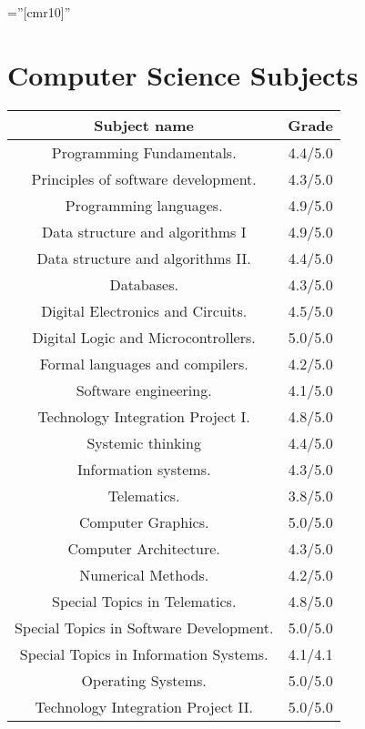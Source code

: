 \documentclass[a4paper,10pt]{article} %
\begin{document}
\pagestyle{empty} %

\font\fb=''[cmr10]'' %


\par{\bigskip\par} %

\section{Computer Science Subjects}
\begin {center}
\begin{tabular}{| c | c |}
 \hline
 \textbf{Subject name} & \textbf{Grade}\\ \hline
Programming Fundamentals. & 4.4/5.0\\
Principles of software development. & 4.3/5.0\\
Programming languages.  & 4.9/5.0\\
Data structure and algorithms I  & 4.9/5.0\\
Data structure and algorithms II. & 4.4/5.0\\
Databases.  & 4.3/5.0\\
Digital Electronics and Circuits.  & 4.5/5.0\\
Digital Logic and Microcontrollers.  & 5.0/5.0\\
Formal languages and compilers.  & 4.2/5.0\\
Software engineering.  & 4.1/5.0\\
Technology Integration Project I.  & 4.8/5.0\\
Systemic thinking  & 4.4/5.0\\
Information systems.  & 4.3/5.0\\
Telematics. & 3.8/5.0\\
Computer Graphics.  & 5.0/5.0\\
Computer Architecture. & 4.3/5.0\\
Numerical Methods. & 4.2/5.0\\
Special Topics in Telematics. & 4.8/5.0\\
Special Topics in Software Development. & 5.0/5.0\\
Special Topics in Information Systems. & 4.1/4.1\\
Operating Systems. & 5.0/5.0\\
Technology Integration Project II. & 5.0/5.0\\
 \hline
\end{tabular}
\end{center}
\end{document}
